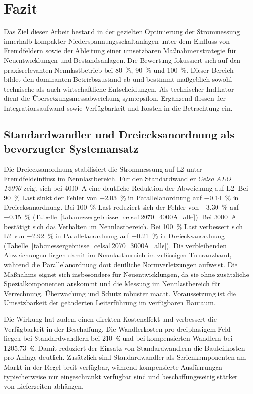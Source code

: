 \section{Fazit}
\label{chap:fazit}

Das Ziel dieser Arbeit bestand in der gezielten Optimierung der Strommessung innerhalb kompakter Niederspannungsschaltanlagen unter dem Einfluss von Fremdfeldern sowie der Ableitung einer umsetzbaren Maßnahmenstrategie für Neuentwicklungen und Bestandsanlagen. Die Bewertung fokussiert sich auf den praxisrelevanten Nennlastbetrieb bei \SI{80}{\percent}, \SI{90}{\percent} und \SI{100}{\percent}. Dieser Bereich bildet den dominanten Betriebszustand ab und bestimmt maßgeblich sowohl technische als auch wirtschaftliche Entscheidungen. Als technischer Indikator dient die Übersetzungsmessabweichung \gls{sym:epsilon}. Ergänzend flossen der Integrationsaufwand sowie Verfügbarkeit und Kosten in die Betrachtung ein.

\subsection*{Standardwandler und Dreiecksanordnung als bevorzugter Systemansatz}

Die Dreiecksanordnung stabilisiert die Strommessung auf L2 unter Fremdfeldeinfluss im Nennlastbereich. Für den Standardwandler \textit{Celsa ALO 12070} zeigt sich bei \SI{4000}{A} eine deutliche Reduktion der Abweichung auf L2. Bei \SI{90}{\percent} Last sinkt der Fehler von \SI{-2,03}{\percent} in Parallelanordnung auf \SI{-0,14}{\percent} in Dreiecksanordnung. Bei \SI{100}{\percent} Last reduziert sich der Fehler von \SI{-3,30}{\percent} auf \SI{-0,15}{\percent} (Tabelle~\ref{tab:messergebnisse_celsa12070_4000A_alle}). Bei \SI{3000}{A} bestätigt sich das Verhalten im Nennlastbereich. Bei \SI{100}{\percent} Last verbessert sich L2 von \SI{-2,92}{\percent} in Parallelanordnung auf \SI{-0,21}{\percent} in Dreiecksanordnung (Tabelle~\ref{tab:messergebnisse_celsa12070_3000A_alle}). Die verbleibenden Abweichungen liegen damit im Nennlastbereich im zulässigen Toleranzband, während die Parallelanordnung dort deutliche Normverletzungen aufweist. Die Maßnahme eignet sich insbesondere für Neuentwicklungen, da sie ohne zusätzliche Spezialkomponenten auskommt und die Messung im Nennlastbereich für Verrechnung, Überwachung und Schutz robuster macht. Voraussetzung ist die Umsetzbarkeit der geänderten Leiterführung im verfügbaren Bauraum.

Die Wirkung hat zudem einen direkten Kosteneffekt und verbessert die Verfügbarkeit in der Beschaffung. Die Wandlerkosten pro dreiphasigem Feld liegen bei Standardwandlern bei \SI{210}{\euro} und bei kompensierten Wandlern bei \SI{1205,73}{\euro}. Damit reduziert der Einsatz von Standardwandlern die Bauteilkosten pro Anlage deutlich. Zusätzlich sind Standardwandler als Serienkomponenten am Markt in der Regel breit verfügbar, während kompensierte Ausführungen typischerweise nur eingeschränkt verfügbar sind und beschaffungsseitig stärker von Lieferzeiten abhängen.

